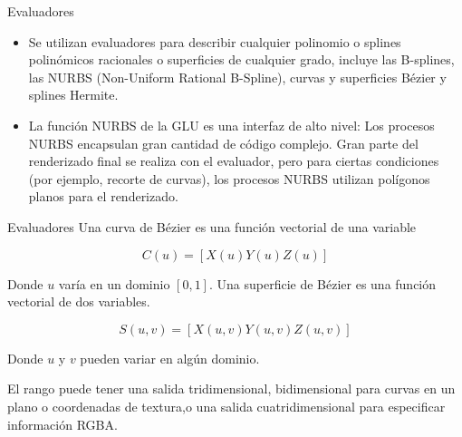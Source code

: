 \documentclass[10.5pt]{beamer}
\begin{document}
\begin{frame}{Evaluadores}
\begin{itemize}
\justifying
    \item Se utilizan evaluadores para describir cualquier polinomio o splines polinómicos racionales o superficies de cualquier grado, incluye las B-splines, las NURBS (Non-Uniform Rational B-Spline), curvas y superficies Bézier y splines Hermite.

     \item   La función NURBS de la GLU es una interfaz de alto nivel: Los procesos NURBS encapsulan gran cantidad de código complejo. Gran parte del renderizado final se realiza con el evaluador, pero para ciertas condiciones (por ejemplo, recorte de curvas), los procesos NURBS utilizan polígonos planos para el renderizado.
\end{itemize}
\end{frame}
\begin{frame}{Evaluadores}
\justifying
 Una curva de Bézier es una función vectorial de una variable
 \begin{block}
 \small
      \begin{equation*}
         C\left(u\right)=[X\left(u\right)Y\left(u\right)Z\left(u\right)]
      \end{equation*}
 \end{block}

Donde $u$ varía en un dominio $[0,1]$. Una superficie de Bézier es una función vectorial de dos variables.

\begin{block}
 \small
    \begin{equation*}
    S\left(u,v\right)=[X\left(u,v\right)Y\left(u,v\right)Z\left(u,v\right)]
    \end{equation*}
\end{block}

Donde $u$ y $v$ pueden variar en algún dominio. \newline

El rango puede tener una salida tridimensional, bidimensional para curvas en un plano o coordenadas de textura,o una salida cuatridimensional para especificar información RGBA.
\end{frame}
\end{document}
